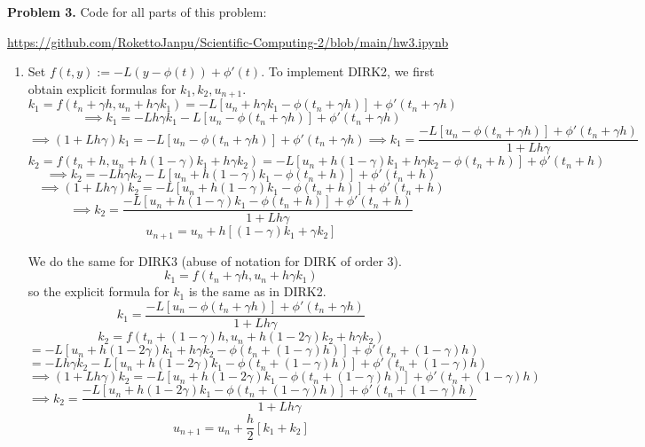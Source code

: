 \documentclass{article}
\def\tbf#1{\textbf{#1}}
\newcommand{\sbr}[1]{\left[#1\right]}
\newcommand{\imp}{\implies}
\begin{document}
\tbf{Problem 3.} Code for all parts of this problem:

\url{https://github.com/RokettoJanpu/Scientific-Computing-2/blob/main/hw3.ipynb}

\begin{enumerate}[label=(\alph*)]
	
\item Set $f(t,y):=-L(y-\phi(t))+\phi'(t)$. To implement DIRK2, we first obtain explicit formulas for $k_1,k_2,u_{n+1}$.
$$k_1 = f(t_n+\gamma h,u_n+h\gamma k_1)
= -L\sbr{u_n+h\gamma k_1-\phi(t_n+\gamma h)}+\phi'(t_n+\gamma h)$$
$$\imp k_1 = -Lh\gamma k_1-L\sbr{u_n-\phi(t_n+\gamma h)}+\phi'(t_n+\gamma h)$$
$$\imp (1+Lh\gamma)k_1 = -L\sbr{u_n-\phi(t_n+\gamma h)}+\phi'(t_n+\gamma h)
\imp k_1 = \frac{-L\sbr{u_n-\phi(t_n+\gamma h)}+\phi'(t_n+\gamma h)}{1+Lh\gamma}$$
$$k_2 = f(t_n+h,u_n+h(1-\gamma)k_1+h\gamma k_2) = -L\sbr{u_n+h(1-\gamma)k_1+h\gamma k_2-\phi(t_n+h)}+\phi'(t_n+h)$$
$$\imp k_2 = -Lh\gamma k_2-L\sbr{u_n+h(1-\gamma)k_1-\phi(t_n+h)}+\phi'(t_n+h)$$
$$\imp (1+Lh\gamma)k_2 = -L\sbr{u_n+h(1-\gamma)k_1-\phi(t_n+h)}+\phi'(t_n+h)$$
$$\imp k_2 = \frac{-L\sbr{u_n+h(1-\gamma)k_1-\phi(t_n+h)}+\phi'(t_n+h)}{1+Lh\gamma}$$
$$u_{n+1} = u_n+h\sbr{(1-\gamma)k_1+\gamma k_2}$$

We do the same for DIRK3 (abuse of notation for DIRK of order 3).
$$k_1 = f(t_n+\gamma h,u_n+h\gamma k_1)$$
so the explicit formula for $k_1$ is the same as in DIRK2.
$$k_1 = \frac{-L\sbr{u_n-\phi(t_n+\gamma h)}+\phi'(t_n+\gamma h)}{1+Lh\gamma}$$
$$k_2 = f(t_n+(1-\gamma)h,u_n+h(1-2\gamma)k_2+h\gamma k_2)$$
$$= -L\sbr{u_n+h(1-2\gamma)k_1+h\gamma k_2-\phi(t_n+(1-\gamma)h)}+\phi'(t_n+(1-\gamma)h)$$
$$= -Lh\gamma k_2-L\sbr{u_n+h(1-2\gamma)k_1-\phi(t_n+(1-\gamma)h)}+\phi'(t_n+(1-\gamma)h)$$
$$\imp (1+Lh\gamma)k_2 = -L\sbr{u_n+h(1-2\gamma)k_1-\phi(t_n+(1-\gamma)h)}+\phi'(t_n+(1-\gamma)h)$$
$$\imp k_2 = \frac{-L\sbr{u_n+h(1-2\gamma)k_1-\phi(t_n+(1-\gamma)h)}+\phi'(t_n+(1-\gamma)h)}{1+Lh\gamma}$$
$$u_{n+1} = u_n+\frac h2[k_1+k_2]$$



\end{enumerate}
\end{document}
